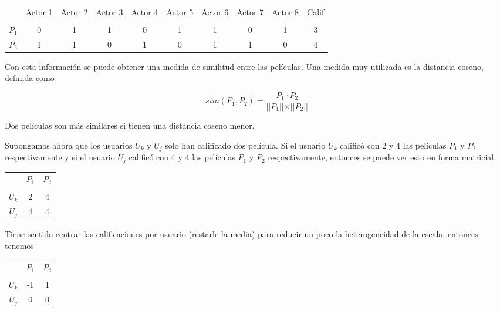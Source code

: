 \begin{center}
\begin{tabular}{ c | c  c c c c c c c c}
    & Actor 1 & Actor 2 & Actor 3 & Actor 4 & Actor 5 & Actor 6 & Actor 7 & Actor 8 & Calif \\ \\
  \hline                       
$P_1$ & 0 & 1 & 1 & 0 & 1 & 1 & 0 & 1 & 3 \\
$P_2$ & 1 & 1 & 0 & 1 & 0 & 1 & 1 & 0 & 4 \\
  \hline  
\end{tabular}
\end{center}

Con esta información se puede obtener una medida de similitud entre las películas. Una medida muy utilizada es la distancia coseno, definida como

\begin{equation}
sim(P_1, P_2) = \dfrac{P_1 \cdot P_2}{\vert \vert P_1 \vert \vert \times \vert \vert P_2 \vert \vert}
\end{equation}

Dos películas son más similares si tienen una distancia coseno menor.

Supongamos ahora que los usuarios $U_k$ y $U_j$ solo han calificado dos película. Si el usuario $U_k$ calificó con 2 y 4 las películas $P_1$ y $P_2$ respectivamente y si el usuario $U_j$ calificó con 4 y 4 las películas $P_1$ y $P_2$ respectivamente, entonces se puede ver esto en forma matricial.

\begin{center}
\begin{tabular}{ c | c  c }
    & $P_1$ & $P_2$ \\ \\
  \hline                       
$U_k$ & 2 & 4 \\
$U_j$ & 4 & 4 \\
  \hline  
\end{tabular}
\end{center}

Tiene sentido centrar las calificaciones por usuario (restarle la media) para reducir un poco la heterogeneidad de la escala, entonces tenemos

\begin{center}
\begin{tabular}{ c | c  c }
    & $P_1$ & $P_2$ \\ \\
  \hline                       
$U_k$ & -1 & 1 \\
$U_j$ & 0 & 0 \\
  \hline  
\end{tabular}
\end{center}

